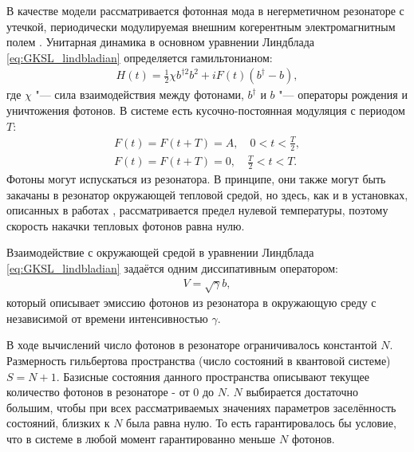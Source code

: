 В качестве модели рассматривается фотонная мода в негерметичном резонаторе с утечкой, периодически модулируемая внешним когерентным электромагнитным полем \cite{Spiller1994, Brun1996}. Унитарная динамика в основном уравнении Линдблада \cref{eq:GKSL_lindbladian} определяется гамильтонианом:
\begin{equation}
	\label{eq:pwtd_H}
	\begin{gathered}
		H(t) = \frac{1}{2}\chi b^{\dagger 2}b^2 +iF(t)(b^{\dagger} - b),
	\end{gathered}
\end{equation}
где $\chi$ "--- сила взаимодействия между фотонами, $b^\dagger$ и $b$ "---
операторы рождения и уничтожения фотонов.
В системе есть кусочно-постоянная модуляция с периодом $T$:
\begin{equation}
	\label{eq:pwtd_mod}
	\begin{gathered}
	F(t) = F(t+T) = A, \quad 0 < t < \frac{T}{2}, \\
	F(t) = F(t+T) = 0, \quad \frac{T}{2} < t < T.
	\end{gathered}
\end{equation}
Фотоны могут испускаться из резонатора. В принципе, они также могут быть закачаны в резонатор окружающей тепловой средой, но здесь, как и в установках, описанных в работах \cite{Spiller1994, Brun1996},
рассматривается предел нулевой температуры, поэтому скорость накачки тепловых фотонов равна нулю.

Взаимодействие с окружающей средой в уравнении Линдблада \cref{eq:GKSL_lindbladian} задаётся одним диссипативным оператором:
\begin{equation}
	\label{eq:pwtd_diss}
	\begin{gathered}
		V = \sqrt{\gamma} b,
	\end{gathered}
\end{equation}
который описывает эмиссию фотонов из резонатора в окружающую среду с независимой от времени интенсивностью $\gamma$.

В ходе вычислений число фотонов в резонаторе ограничивалось константой $N$. Размерность гильбертова пространства (число состояний в квантовой системе) $S = N + 1$. Базисные состояния данного пространства описывают текущее количество фотонов в резонаторе - от $0$ до $N$. $N$ выбирается достаточно большим, чтобы при всех рассматриваемых значениях параметров заселённость состояний, близких к $N$ была равна нулю. То есть гарантировалось бы условие, что в системе в любой момент гарантированно меньше $N$ фотонов.

